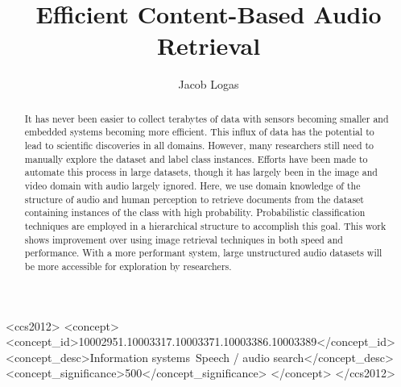 \documentclass[sigchi]{acmart}
\begin{document}
\title{Efficient Content-Based Audio Retrieval}

\author{Jacob Logas}
\orcid{}

\renewcommand{\shortauthors}{J. Logas}


\begin{abstract}
    It has never been easier to collect terabytes of data with sensors becoming smaller and embedded systems becoming more efficient. This influx of data has the potential to lead to scientific discoveries in all domains. However, many researchers still need to manually explore the dataset and label class instances. Efforts have been made to automate this process in large datasets, though it has largely been in the image and video domain with audio largely ignored. Here, we use domain knowledge of the structure of audio and human perception to retrieve documents from the dataset containing instances of the class with high probability. Probabilistic classification techniques are employed in a hierarchical structure to accomplish this goal. This work shows improvement over using image retrieval techniques in both speed and performance. With a more performant system, large unstructured audio datasets will be more accessible for exploration by researchers.
\end{abstract}

%
%
\begin{CCSXML}
  <ccs2012>
  <concept>
  <concept_id>10002951.10003317.10003371.10003386.10003389</concept_id>
  <concept_desc>Information systems~Speech / audio search</concept_desc>
  <concept_significance>500</concept_significance>
  </concept>
  </ccs2012>
\end{CCSXML}
  





\maketitle





\end{document}
